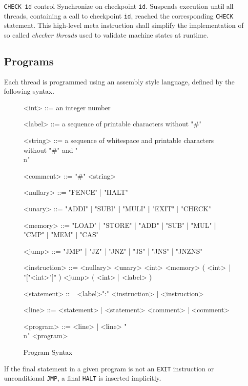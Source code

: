 {\lstinline[language={[concubine]Assembler}]{CHECK id}}
{control}
{Synchronize on checkpoint \texttt{id}.
Suspends execution until all threads, containing a call to checkpoint \texttt{id}, reached the corresponding \lstinline[language={[concubine]Assembler}]{CHECK} statement.
This high-level meta instruction shall simplify the implementation of so called \emph{checker threads} used to validate machine states at runtime.}

\subsection{Programs}

Each thread is programmed using an assembly style language, defined by the following syntax.

\begin{figure}[h]
\begin{grammar}
\small

<int> ::= an integer number

<label> ::= a sequence of printable characters without "#"

<string> ::= a sequence of whitespace and printable characters without "#" and "\\n"

<comment> ::= "#" <string>

<nullary> ::= "FENCE" | "HALT"

<unary> ::= "ADDI" | "SUBI" | "MULI" | "EXIT" | "CHECK"

<memory> ::= "LOAD" | "STORE" | "ADD" | "SUB" | "MUL" | "CMP" | "MEM" | "CAS"

<jump> ::= "JMP" | "JZ" | "JNZ" | "JS" | "JNS" | "JNZNS"

<instruction> ::= <nullary>
\alt <unary> <int>
\alt <memory> ( <int> | "["<int>"]" )
\alt <jump> ( <int> | <label> )

<statement> ::= <label>":" <instruction> | <instruction>

<line> ::= <statement> | <statement> <comment> | <comment>

<program> ::= <line> | <line> "\\n" <program>
\end{grammar}
\caption{Program Syntax}
\label{fig:syntax:program}
\end{figure}

If the final statement in a given program is not an \lstinline[language={[concubine]Assembler}]{EXIT} instruction or unconditional \lstinline[language={[concubine]Assembler}]{JMP}, a final \lstinline[language={[concubine]Assembler}]{HALT} is inserted implicitly.

